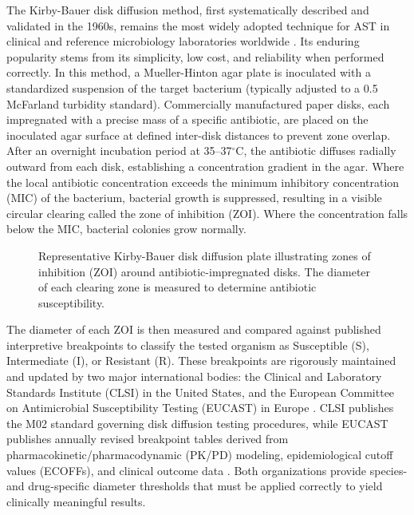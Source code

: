 The Kirby-Bauer disk diffusion method, first systematically described and validated in the 1960s,
remains the most widely adopted technique for AST in clinical and reference microbiology laboratories
worldwide \cite{asm2009kirby,clsi2025}. Its enduring popularity stems from its simplicity, low cost, and
reliability when performed correctly. In this method, a Mueller-Hinton agar plate is inoculated with
a standardized suspension of the target bacterium (typically adjusted to a 0.5 McFarland turbidity
standard). Commercially manufactured paper disks, each impregnated with a precise mass of a specific
antibiotic, are placed on the inoculated agar surface at defined inter-disk distances to prevent
zone overlap. After an overnight incubation period at 35--37$^\circ$C, the antibiotic diffuses
radially outward from each disk, establishing a concentration gradient in the agar. Where the local
antibiotic concentration exceeds the minimum inhibitory concentration (MIC) of the bacterium,
bacterial growth is suppressed, resulting in a visible circular clearing called the zone of
inhibition (ZOI). Where the concentration falls below the MIC, bacterial colonies grow normally.

\begin{figure}[H]
  \centering
  \caption{Representative Kirby-Bauer disk diffusion plate illustrating zones of inhibition (ZOI)
    around antibiotic-impregnated disks. The diameter of each clearing zone is measured to
    determine antibiotic susceptibility.}
  \label{fig:kirby_bauer}
\end{figure}

The diameter of each ZOI is then measured and compared against published interpretive breakpoints
to classify the tested organism as Susceptible (S), Intermediate (I), or Resistant (R). These
breakpoints are rigorously maintained and updated by two major international bodies: the
Clinical and Laboratory Standards Institute (CLSI) in the United States, and the European Committee
on Antimicrobial Susceptibility Testing (EUCAST) in Europe \cite{eucast2023}. CLSI publishes
the M02 standard governing disk diffusion testing procedures, while EUCAST publishes annually
revised breakpoint tables derived from pharmacokinetic/pharmacodynamic (PK/PD) modeling,
epidemiological cutoff values (ECOFFs), and clinical outcome data \cite{giske2022}. Both
organizations provide species- and drug-specific diameter thresholds that must be applied
correctly to yield clinically meaningful results.

